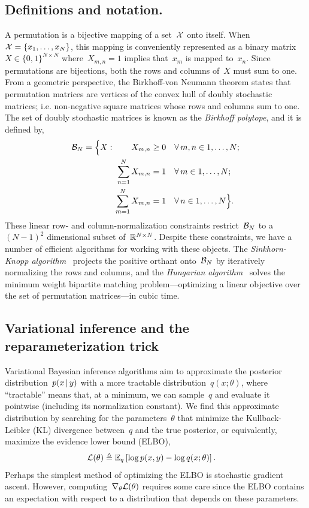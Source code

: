 \documentclass[twoside]{article}
\begin{document}
\subsection{Definitions and notation.}  A permutation is a bijective
mapping of a set~$\mathcal{X}$ onto itself.
When~${\mathcal{X} = \{x_1, \ldots, x_N\}}$, this mapping is conveniently
represented as a binary matrix~${X \in \{0,1\}^{N \times N}}$
where~${X_{m,n}=1}$ implies that~$x_m$ is mapped to~$x_n$.  Since
permutations are bijections, both the rows and columns of~$X$ must
sum to one.  From a geometric perspective, the Birkhoff-von Neumann
theorem states that permutation matrices are vertices of the convex
hull of doubly stochastic matrices; i.e. non-negative square matrices
whose rows and columns sum to one. The set of doubly
stochastic matrices is known as the \emph{Birkhoff polytope}, and it
is defined by,
\begin{align*}
  \mathcal{B}_N = \Big \{X : \qquad 
           X_{m,n} &\geq 0   & &\forall \, m,n \in 1, \ldots, N; \\
           \sum_{n=1}^N X_{m,n} &= 1  & &\forall \, m \in 1, \ldots, N; \\
           \sum_{m=1}^N X_{m,n} & =1 &  &\forall \, n \in 1, \ldots, N \Big\}.
\end{align*}
These linear row- and column-normalization constraints
restrict~$\mathcal{B}_N$ to a~${(N-1)^2}$ dimensional subset
of~$\mathbb{R}^{N \times N}$.  Despite these constraints, we have a number
of efficient algorithms for working with these objects.  The
\emph{Sinkhorn-Knopp algorithm}~\citep{sinkhorn1967concerning}
projects the positive orthant onto~$\mathcal{B}_N$ by iteratively normalizing
the rows and columns, and the \emph{Hungarian
  algorithm}~\citep{kuhn1955hungarian, munkres1957algorithms} solves
the minimum weight bipartite matching problem---optimizing a linear
objective over the set of permutation matrices---in cubic time.





\subsection{Variational inference and the reparameterization trick}
Variational Bayesian inference algorithms aim to approximate the
posterior distribution~$p(x \, | \, y)$ with a more tractable
distribution~$q(x; \theta)$, where ``tractable'' means that, at a
minimum, we can sample~$q$ and evaluate it pointwise (including
its normalization constant).  We find this approximate distribution
by searching for the parameters~$\theta$ that minimize the Kullback-Leibler (KL)
divergence between~$q$ and the true posterior, or equivalently,
maximize the evidence lower bound (ELBO),
\begin{align*}
  \mathcal{L}(\theta) &\triangleq \mathbb{E}_q \left[ \log p(x, y) - \log q(x; \theta) \right].
\end{align*}
Perhaps the simplest method of optimizing the ELBO is stochastic
gradient ascent. 
However, computing~$\nabla_\theta \mathcal{L}(\theta)$ requires some care
since the ELBO contains an expectation with respect to a distribution
that depends on these parameters.
\end{document}
